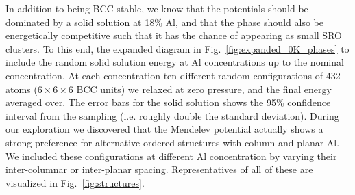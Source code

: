 In addition to being BCC stable, we know that the potentials should be dominated by a solid solution at 18\% Al, and that the \DOTHREE phase should also be energetically competitive such that it has the chance of appearing as small SRO clusters.
To this end, the expanded diagram in Fig.~\ref{fig:expanded_0K_phases} to include the random solid solution energy at Al concentrations up to the nominal \DOTHREE concentration.
At each concentration ten different random configurations of 432 atoms ($6\times6\times6$ BCC units) we relaxed at zero pressure, and the final energy averaged over.
The error bars for the solid solution shows the 95\% confidence interval from the sampling (i.e. roughly double the standard deviation).
During our exploration we discovered that the Mendelev potential actually shows a strong preference for alternative ordered structures with column and planar Al.
We included these configurations at different Al concentration by varying their inter-columnar or inter-planar spacing.
Representatives of all of these are visualized in Fig.~\ref{fig:structures}.
%
